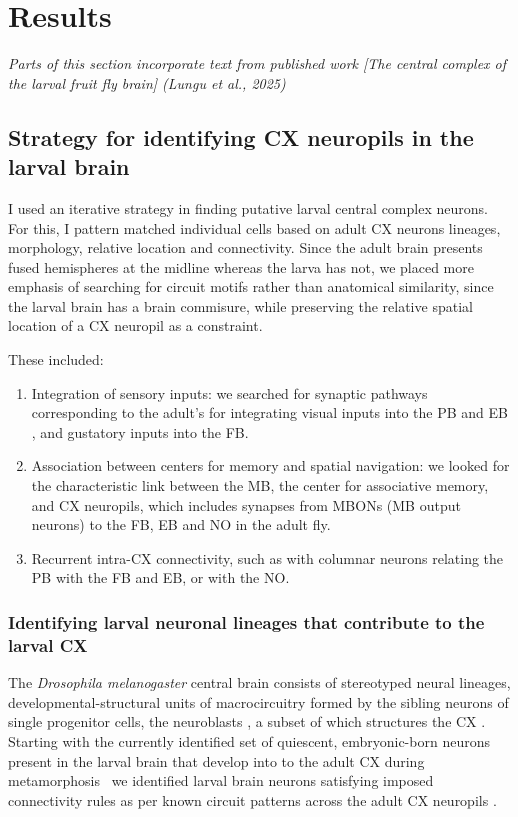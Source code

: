 
\chapter{Results}
\textit{Parts of this section incorporate text from published work [The central complex of the larval fruit fly brain] (Lungu et al., 2025)}

\section{Strategy for identifying CX neuropils in the larval brain}

    I used an iterative strategy in finding putative larval central complex neurons. For this, I pattern matched individual cells based on adult CX neurons lineages, morphology, relative location and connectivity. %
    Since the adult brain presents fused hemispheres at the midline whereas the larva has not, we placed more emphasis of searching for circuit motifs rather than anatomical similarity, since the larval brain has a brain commisure, while preserving the relative spatial location of a CX neuropil as a constraint.

    These included:
    \begin{enumerate}
    \item Integration of sensory inputs: we searched for synaptic pathways corresponding to the adult's for integrating visual inputs into the PB and EB \citep{hulse2021connectome}, and gustatory inputs into the FB.
    \item Association between centers for memory and spatial navigation: we looked for the characteristic link between the MB, the center for associative memory, and CX neuropils, which includes synapses from MBONs (MB output neurons) to the FB, EB and NO in the adult fly.
    \item Recurrent intra-CX connectivity, such as with columnar neurons relating the PB with the FB and EB, or with the NO.
    \end{enumerate}
    
    \subsection{Identifying larval neuronal lineages that contribute to the larval CX}
    The \textit{Drosophila melanogaster} central brain consists of stereotyped neural lineages, developmental-structural units of macrocircuitry formed by the sibling neurons of single progenitor cells, the neuroblasts \citep{Spindler2010Lineages}, a subset of which structures the CX \citep{Pereanu2011LineagesCX}.
    Starting with the currently identified set of quiescent, embryonic-born neurons present in the larval brain that develop into to the adult CX during metamorphosis~\citep{andrade2019developmentally}
    we identified larval brain neurons satisfying imposed connectivity rules as per known circuit patterns across the adult CX neuropils \citep{wolff2015neuroarchitecture, wolff2018neuroarchitecture, franconville2018building, hulse2021connectome}.

